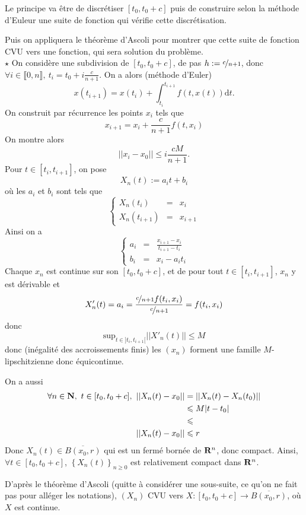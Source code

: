 \documentclass[a4paper,11pt, twoside]{article}
\begin{document}
\begin{Proof}
  Le principe va être de discrétiser $[t_0,t_0+c]$ puis de construire selon la méthode d'Euleur une suite de fonction qui vérifie cette discrétisation.

  Puis on appliquera le théorème d'Ascoli pour montrer que cette suite de fonction CVU vers une fonction, qui sera solution du problème.\\

  $\star$ On considère une subdivision de $[t_0,t_0+c]$, de pas $h:=\nicefrac{c}{n+1}$, donc $\forall i\in\llbracket 0,n\rrbracket,\ t_i=t_0+i\frac{c}{n+1}$. On a alors (méthode d'Euler)
  $$x(t_{i+1})=x(t_i)+\int_{t_i}^{t_{i+1}}f(t,x(t))\mathrm dt.$$
  On construit par récurrence les points $x_i$ tels que 
  $$x_{i+1}=x_i+\frac{c}{n+1}f(t,x_i)$$
  On montre alors 
  $$||x_i-x_0||\leqslant i\frac{cM}{n+1}.$$
  Pour $t\in[t_i,t_{i+1}]$, on pose 
  $$X_n(t):=a_it+b_i$$
  où les $a_i$ et $b_i$ sont tels que 
  $$\left\{\begin{array}{ccl}
    X_n(t_i)&=&x_i\\
    X_n(t_{i+1})&=&x_{i+1}
  \end{array}\right.$$
  Ainsi on a 
  $$\left\{\begin{array}{ccl}
    \displaystyle a_i&=&\frac{x_{i+1}-x_i}{t_{i+1}-t_i}\\
    b_i&=&x_i-a_i t_i
  \end{array}\right.$$
  Chaque $x_n$ est continue sur son $[t_0,t_0+c]$, et de pour tout $t\in [t_i,t_{i+1}]$, $x_n$ y est dérivable et 
  $$X'_n(t)=a_i=\frac{\nicefrac{c}{n+1}f(t_i,x_i)}{\nicefrac{c}{n+1}}=f(t_i,x_i)$$
  donc 
  $$\mathrm{sup}_{t\in]t_i,t_{i+1}[}||X'_n(t)||\leqslant M$$
  donc (inégalité des accroissements finis) les $(x_n)$ forment une famille $M$-lipschitzienne donc équicontinue.

  On a aussi
  \begin{align*}
    \forall n\in\N,\ t\in [t_0,t_0+c],\ ||X_n(t)-x_0||&=||X_n(t)-X_n(t_0)||\\
    &\leqslant M|t-t_0|\\
    &\leqslant \\
    ||X_n(t)-x_0||&\leqslant r\\
  \end{align*}
  Donc $X_n(t)\in\overline{B(x_0,r)}$ qui est un fermé bornée de $\mathbf R^n$, donc compact. Ainsi, $\forall t\in [t_0,t_0+c]$, $\left\{X_n(t)\right\}_{n\geqslant 0}$ est relativement compact dans $\mathbf R^n$.

  D'après le théorème d'Ascoli (quitte à considérer une sous-suite, ce qu'on ne fait pas pour alléger les notations), $(X_n)$ CVU vers $X:[t_0,t_0+c]\longrightarrow\overline{B(x_0,r)}$, où $X$ est continue.


\end{Proof}
\end{document}
